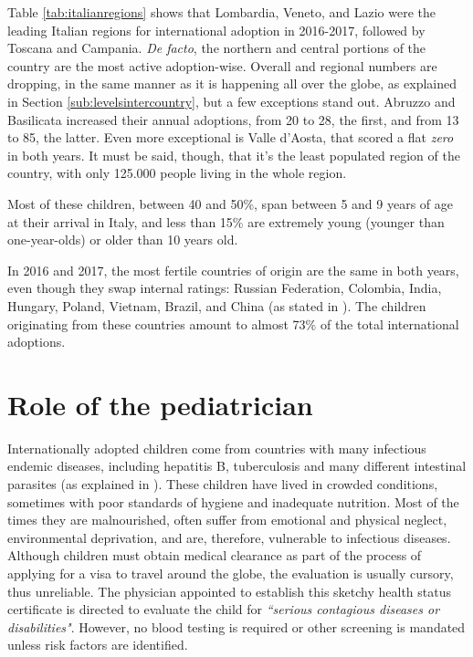 Table \ref{tab:italianregions} shows that Lombardia, Veneto, and Lazio were the leading Italian regions for international adoption in 2016-2017, followed by Toscana and Campania. \textit{De facto}, the northern and central portions of the country are the most active adoption-wise.  Overall and regional numbers are dropping, in the same manner as it is happening all over the globe, as explained in Section \ref{sub:levelsintercountry}, but a few exceptions stand out. Abruzzo and Basilicata increased their annual adoptions, from 20 to 28, the first, and from 13 to 85, the latter. Even more exceptional is Valle d'Aosta, that scored a flat \textit{zero} in both years. It must be said, though, that it's the least populated region of the country, with only 125.000 people living in the whole region.

Most of these children, between 40 and 50\%, span between 5 and 9 years of age at their arrival in Italy, and less than 15\% are extremely young (younger than one-year-olds) or older than 10 years old. 

In 2016 and 2017, the most fertile countries of origin are the same in both years, even though they swap internal ratings: Russian Federation, Colombia, India, Hungary, Poland, Vietnam, Brazil, and China (as stated in \cite{cai2016}). The children originating from these countries amount to almost 73\% of the total international adoptions.

\section{Role of the pediatrician}\label{sec:roleofpediatrician}
Internationally adopted children come from countries with many infectious endemic diseases, including hepatitis B, tuberculosis and many different intestinal parasites (as explained in \cite{caringfor}). These children have lived in crowded conditions, sometimes with poor standards of hygiene and inadequate nutrition. Most of the times they are malnourished, often suffer from emotional and physical neglect, environmental deprivation, and are, therefore, vulnerable to infectious diseases. Although children must obtain medical clearance as part of the process of applying for a visa to travel around the globe, the evaluation is usually cursory, thus unreliable. The physician appointed to establish this sketchy health status certificate is directed to evaluate the child for \textit{``serious contagious diseases or disabilities"}. However, no blood testing is required or other screening is mandated unless risk factors are identified.

